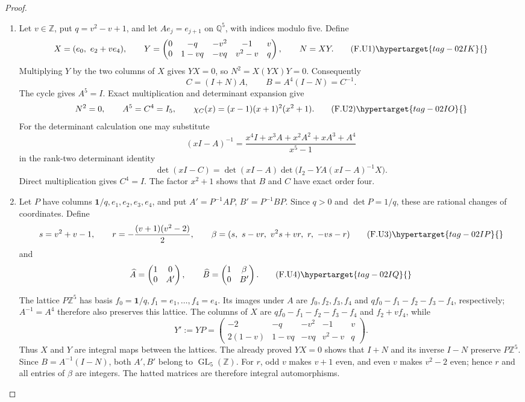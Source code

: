 \begin{proof}
\begin{enumerate}[label={$\langle1\rangle$\arabic*.}]
\item Let $v\in\mathbb Z$, put $q=v^2-v+1$, and let
$Ae_j=e_{j+1}$ on $\mathbb Q^5$, with indices modulo five. Define
\[
 X=(e_0,\ e_2+ve_4),\qquad
 Y=\begin{pmatrix}
 0&-q&-v^2&-1&v\\
 0&1-vq&-vq&v^2-v&q
 \end{pmatrix},\qquad N=XY.
 \tag{F.U1}\hypertarget{tag-02IK}{}\label{maps:eq:F.U1}
\]
Multiplying $Y$ by the two columns of $X$ gives $YX=0$, so
$N^2=X(YX)Y=0$. Consequently
\[
 C=(I+N)A,\qquad B=A^4(I-N)=C^{-1}.
\]
The cycle gives $A^5=I$. Exact multiplication and determinant
expansion give
\[
 N^2=0,\qquad A^5=C^4=I_5,\qquad
 \chi_C(x)=(x-1)(x+1)^2(x^2+1).
 \tag{F.U2}\hypertarget{tag-02IO}{}\label{maps:eq:F.U2}
\]
For the determinant calculation one may substitute
\[
 (xI-A)^{-1}=
 \frac{x^4I+x^3A+x^2A^2+xA^3+A^4}{x^5-1}
\]
in the rank-two determinant identity
\[
 \det(xI-C)=\det(xI-A)
       \det\bigl(I_2-YA(xI-A)^{-1}X\bigr).
\]
Direct multiplication gives $C^4=I$.
The factor $x^2+1$ shows that $B$ and $C$ have exact order four.

\item Let $P$ have columns $\mathbf1/q,e_1,e_2,e_3,e_4$, and put
$A'=P^{-1}AP$, $B'=P^{-1}BP$. Since $q>0$ and $\det P=1/q$,
these are rational changes of coordinates. Define
\[
 s=v^2+v-1,\qquad r=-\frac{(v+1)(v^2-2)}2,
 \qquad
 \beta=(s,\ s-vr,\ v^2s+vr,\ r,\ -vs-r)
 \tag{F.U3}\hypertarget{tag-02IP}{}\label{maps:eq:F.U3}
\]
and
\[
 \widehat A=\begin{pmatrix}1&0\\0&A'\end{pmatrix},\qquad
 \widehat B=\begin{pmatrix}1&\beta\\0&B'\end{pmatrix}.
 \tag{F.U4}\hypertarget{tag-02IQ}{}\label{maps:eq:F.U4}
\]

The lattice $P\mathbb Z^5$ has basis
$f_0=\mathbf1/q,f_1=e_1,\ldots,f_4=e_4$.
Its images under $A$ are $f_0,f_2,f_3,f_4$ and
$qf_0-f_1-f_2-f_3-f_4$, respectively; $A^{-1}=A^4$
therefore also preserves this lattice. The columns of $X$ are
$qf_0-f_1-f_2-f_3-f_4$ and $f_2+vf_4$, while
\[
 Y':=YP=\begin{pmatrix}
 -2&-q&-v^2&-1&v\\
 2(1-v)&1-vq&-vq&v^2-v&q
 \end{pmatrix}.
\]
Thus $X$ and $Y$ are integral maps between the lattices.
The already proved $YX=0$ shows that $I+N$ and its inverse $I-N$
preserve $P\mathbb Z^5$. Since $B=A^{-1}(I-N)$, both
$A',B'$ belong to $\operatorname{GL}_5(\mathbb Z)$.
For $r$, odd $v$ makes $v+1$ even, and even $v$ makes
$v^2-2$ even; hence $r$ and all entries of $\beta$ are integers.
The hatted matrices are therefore integral automorphisms.


\end{enumerate}
\end{proof}
